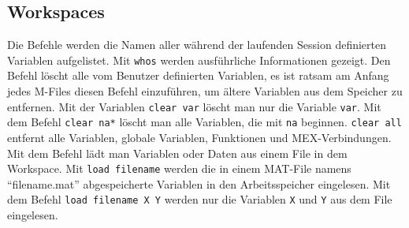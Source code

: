 \subsection{Workspaces}
Die Befehle  werden die Namen aller während der laufenden Session definierten Variablen aufgelistet. Mit {\color{red}\texttt{whos}} werden ausführliche Informationen gezeigt.
\newline\newline
Den Befehl  löscht alle vom Benutzer definierten Variablen, es ist ratsam am Anfang jedes M-Files diesen Befehl einzuführen, um ältere Variablen aus dem Speicher zu entfernen. Mit der Variablen {\color{red}\texttt{clear var}} löscht man nur die Variable \texttt{var}. Mit dem Befehl {\color{red}\texttt{clear na*}} löscht man alle Variablen, die mit \texttt{na} beginnen. {\color{red}\texttt{clear all}} entfernt alle Variablen, globale Variablen, Funktionen und MEX-Verbindungen.
\newline\newline
Mit dem Befehl  lädt man Variablen oder Daten aus einem File in dem Workspace. Mit {\color{red}\texttt{load filename}} werden die in einem MAT-File namens ``filename.mat'' abgespeicherte Variablen in den Arbeitsspeicher eingelesen. Mit dem Befehl {\color{red}\texttt{load filename X Y}} werden nur die Variablen \texttt{X} und \texttt{Y} aus dem File eingelesen.
\newline\newline
